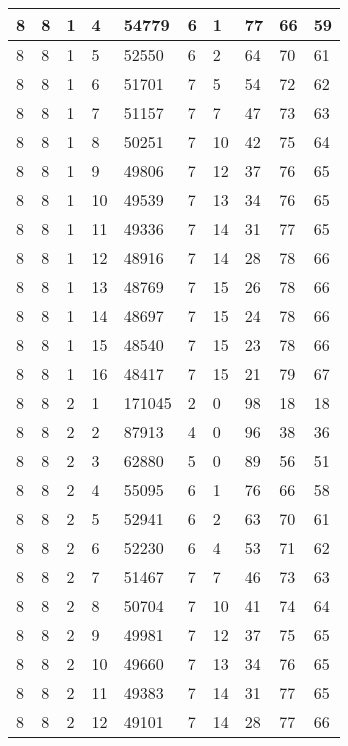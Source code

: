 \begin{table}[!ht]
\begin{tabular}{|l|l|l|l|l|l|l|l|l|l|}
        8 & 8 & 1 & 4 & 54779 & 6 & 1 & 77 & 66 & 59 \\ \hline
        8 & 8 & 1 & 5 & 52550 & 6 & 2 & 64 & 70 & 61 \\ \hline
        8 & 8 & 1 & 6 & 51701 & 7 & 5 & 54 & 72 & 62 \\ \hline
        8 & 8 & 1 & 7 & 51157 & 7 & 7 & 47 & 73 & 63 \\ \hline
        8 & 8 & 1 & 8 & 50251 & 7 & 10 & 42 & 75 & 64 \\ \hline
        8 & 8 & 1 & 9 & 49806 & 7 & 12 & 37 & 76 & 65 \\ \hline
        8 & 8 & 1 & 10 & 49539 & 7 & 13 & 34 & 76 & 65 \\ \hline
        8 & 8 & 1 & 11 & 49336 & 7 & 14 & 31 & 77 & 65 \\ \hline
        8 & 8 & 1 & 12 & 48916 & 7 & 14 & 28 & 78 & 66 \\ \hline
        8 & 8 & 1 & 13 & 48769 & 7 & 15 & 26 & 78 & 66 \\ \hline
        8 & 8 & 1 & 14 & 48697 & 7 & 15 & 24 & 78 & 66 \\ \hline
        8 & 8 & 1 & 15 & 48540 & 7 & 15 & 23 & 78 & 66 \\ \hline
        8 & 8 & 1 & 16 & 48417 & 7 & 15 & 21 & 79 & 67 \\ \hline
        8 & 8 & 2 & 1 & 171045 & 2 & 0 & 98 & 18 & 18 \\ \hline
        8 & 8 & 2 & 2 & 87913 & 4 & 0 & 96 & 38 & 36 \\ \hline
        8 & 8 & 2 & 3 & 62880 & 5 & 0 & 89 & 56 & 51 \\ \hline
        8 & 8 & 2 & 4 & 55095 & 6 & 1 & 76 & 66 & 58 \\ \hline
        8 & 8 & 2 & 5 & 52941 & 6 & 2 & 63 & 70 & 61 \\ \hline
        8 & 8 & 2 & 6 & 52230 & 6 & 4 & 53 & 71 & 62 \\ \hline
        8 & 8 & 2 & 7 & 51467 & 7 & 7 & 46 & 73 & 63 \\ \hline
        8 & 8 & 2 & 8 & 50704 & 7 & 10 & 41 & 74 & 64 \\ \hline
        8 & 8 & 2 & 9 & 49981 & 7 & 12 & 37 & 75 & 65 \\ \hline
        8 & 8 & 2 & 10 & 49660 & 7 & 13 & 34 & 76 & 65 \\ \hline
        8 & 8 & 2 & 11 & 49383 & 7 & 14 & 31 & 77 & 65 \\ \hline
        8 & 8 & 2 & 12 & 49101 & 7 & 14 & 28 & 77 & 66 \\ \hline

\end{tabular}
\end{table}
